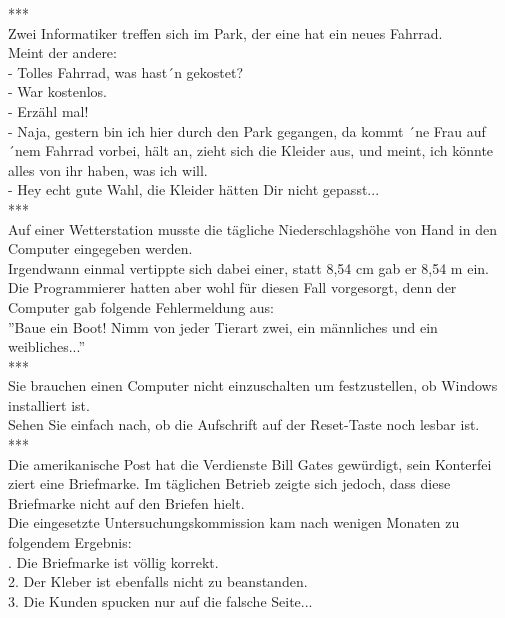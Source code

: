 ***\\


Zwei Informatiker treffen sich im Park, der eine hat ein neues Fahrrad.\\
\newline
Meint der andere: \\
- Tolles Fahrrad, was hast´n gekostet?\\
- War kostenlos.\\
- Erzähl mal!\\
- Naja, gestern bin ich hier durch den Park gegangen, da kommt ´ne Frau auf ´nem Fahrrad vorbei, hält an, zieht sich die Kleider aus, und meint, ich könnte alles von ihr haben, was ich will.\\
- Hey echt gute Wahl, die Kleider hätten Dir nicht gepasst...\\


***\\


Auf einer Wetterstation musste die tägliche Niederschlagshöhe von Hand in den Computer eingegeben werden.\\
\newline
Irgendwann einmal vertippte sich dabei einer, statt 8,54 cm gab er 8,54 m ein. Die Programmierer hatten aber wohl für diesen Fall vorgesorgt, denn der Computer gab folgende Fehlermeldung aus:\\
''Baue ein Boot! Nimm von jeder Tierart zwei, ein männliches und ein weibliches...''\\


***\\


Sie brauchen einen Computer nicht einzuschalten um festzustellen, ob Windows installiert ist. \\
Sehen Sie einfach nach, ob die Aufschrift auf der Reset-Taste noch lesbar ist.\\


***\\


Die amerikanische Post hat die Verdienste Bill Gates gewürdigt, sein Konterfei ziert eine Briefmarke. Im täglichen Betrieb zeigte sich jedoch, dass diese Briefmarke nicht auf den Briefen hielt. \\
Die eingesetzte Untersuchungskommission kam nach wenigen Monaten zu folgendem Ergebnis:\\
. Die Briefmarke ist völlig korrekt.\\
2. Der Kleber ist ebenfalls nicht zu beanstanden.\\
3. Die Kunden spucken nur auf die falsche Seite...\\


